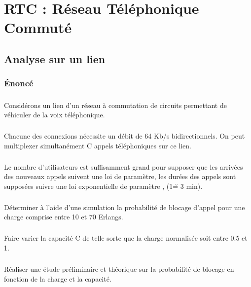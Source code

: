 %
\chapter{RTC : Réseau Téléphonique Commuté}
%
    \section{Analyse sur un lien}
%
        \subsection{Énoncé}
%
            \paragraph{}
Considérons un lien d'un réseau à commutation de circuits permettant de véhiculer de la voix téléphonique.
%
            \paragraph{}
Chacune des connexions nécessite un débit de 64 Kb/s bidirectionnels.
On peut multiplexer simultanément C appels téléphoniques sur ce lien.
%
        \paragraph{}
        Le nombre d'utilisateurs est suffisamment grand pour supposer que les arrivées des nouveaux appels suivent une loi de paramètre, les durées des appels sont supposées suivre une loi exponentielle de paramètre , (1\u = 3 min).

        \paragraph{}
        Déterminer à l'aide d'une simulation la probabilité de blocage d'appel pour une charge comprise entre 10 et 70 Erlangs.

        \paragraph{}
        Faire varier la capacité C de telle sorte que la charge normalisée soit entre 0.5 et 1.

        \paragraph{}
        Réaliser une étude préliminaire et théorique sur la probabilité de blocage en fonction de la charge et la capacité.

